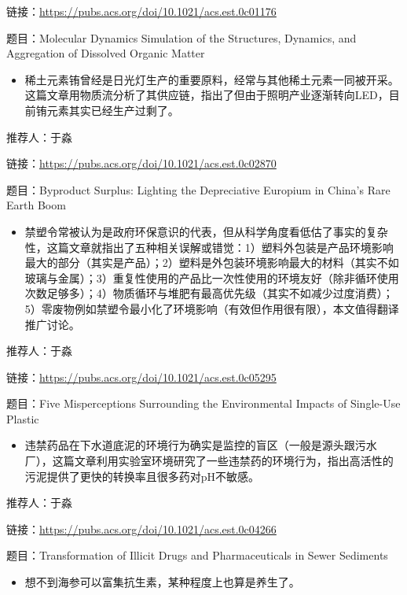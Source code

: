\documentclass[
]{book}
\providecommand{\tightlist}{%
  \setlength{\itemsep}{0pt}\setlength{\parskip}{0pt}}
\begin{document}
链接：\url{https://pubs.acs.org/doi/10.1021/acs.est.0c01176}

题目：Molecular Dynamics Simulation of the Structures, Dynamics, and Aggregation of Dissolved Organic Matter

\begin{itemize}
\tightlist
\item
  稀土元素铕曾经是日光灯生产的重要原料，经常与其他稀土元素一同被开采。这篇文章用物质流分析了其供应链，指出了但由于照明产业逐渐转向LED，目前铕元素其实已经生产过剩了。
\end{itemize}

推荐人：于淼

链接：\url{https://pubs.acs.org/doi/10.1021/acs.est.0c02870}

题目：Byproduct Surplus: Lighting the Depreciative Europium in China's Rare Earth Boom

\begin{itemize}
\tightlist
\item
  禁塑令常被认为是政府环保意识的代表，但从科学角度看低估了事实的复杂性，这篇文章就指出了五种相关误解或错觉：1）塑料外包装是产品环境影响最大的部分（其实是产品）；2）塑料是外包装环境影响最大的材料（其实不如玻璃与金属）；3）重复性使用的产品比一次性使用的环境友好（除非循环使用次数足够多）；4）物质循环与堆肥有最高优先级（其实不如减少过度消费）；5）零废物例如禁塑令最小化了环境影响（有效但作用很有限），本文值得翻译推广讨论。
\end{itemize}

推荐人：于淼

链接：\url{https://pubs.acs.org/doi/10.1021/acs.est.0c05295}

题目：Five Misperceptions Surrounding the Environmental Impacts of Single-Use Plastic

\begin{itemize}
\tightlist
\item
  违禁药品在下水道底泥的环境行为确实是监控的盲区（一般是源头跟污水厂），这篇文章利用实验室环境研究了一些违禁药的环境行为，指出高活性的污泥提供了更快的转换率且很多药对pH不敏感。
\end{itemize}

推荐人：于淼

链接：\url{https://pubs.acs.org/doi/10.1021/acs.est.0c04266}

题目：Transformation of Illicit Drugs and Pharmaceuticals in Sewer Sediments

\begin{itemize}
\tightlist
\item
  想不到海参可以富集抗生素，某种程度上也算是养生了。
\end{itemize}
\end{document}
